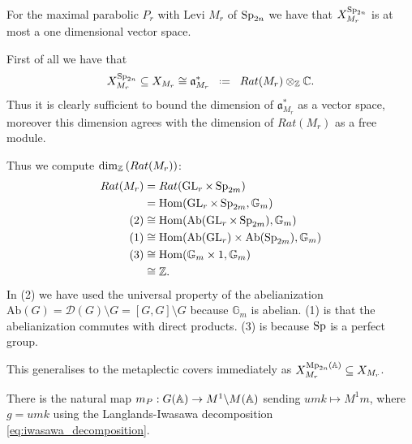 \begin{example}\label{ex:characters}
    For the maximal parabolic \(P_r\) with Levi \(M_r\) of \(\operatorname{Sp}_{2n}\) we have that \( X_{M_r}^{\operatorname{Sp}_{2n}}\) is at most a one dimensional \C vector space. 

    First of all we have that \cite[I.1.4]{moeglinSpectralDecompositionEisenstein1995}
         \[ X_{M_r}^{\Sp_{2n}} \subseteq X_{M_r} \cong \mathfrak{a}_{M_r}^*\defeq Rat(M_r) \tensor_\Z \C.\]
        Thus it is clearly sufficient to bound the dimension of \(\mathfrak{a}_{M_r}^*\) as a \C vector space, moreover this dimension agrees with the dimension of \(Rat(M_r)\) as a free \Z module. 

        Thus we compute \(\dim_\Z(Rat(M_r))\):
        \begin{equation*}
            \begin{aligned}
                Rat(M_r) &= Rat(\GL_r \times \Sp_{2m}) \\
                         &= \Hom(\GL_r \times \Sp_{2m}, \mathbb{G}_m) \\
                         (2)&\cong \Hom(\mathrm{Ab}(\GL_r \times \Sp_{2m}), \mathbb{G}_m) \\
                         (1)&\cong \Hom(\mathrm{Ab}(\GL_r) \times \mathrm{Ab}(\Sp_{2m}), \mathbb{G}_m) \\
                         (3)&\cong \Hom(\mathbb{G}_m \times 1, \mathbb{G}_m) \\
                         &\cong \Z.
            \end{aligned}
        \end{equation*}
        In (2) we have used the universal property of the abelianization \(\mathrm{Ab}(G) = \mathcal{D}(G) \setminus G = [G, G] \setminus G \) because \(\mathbb{G}_m\) is abelian. (1) is that the abelianization commutes with direct products. (3) is because \(\operatorname{Sp}\) is a perfect group.
\end{example}

\begin{remark}\label{Metaplectic_characters}
    This generalises to the metaplectic covers immediately as \( X_{M_r}^{\Mp_{2n}(\A)} \subseteq X_{M_r}\).
\end{remark}
There is the natural map \(m_P: G(\A) \to M^1 \backslash M(\A)\) sending \(umk \mapsto M^1 m\), where \(g = umk\) using the Langlands-Iwasawa decomposition \ref{eq:iwasawa_decomposition}.

